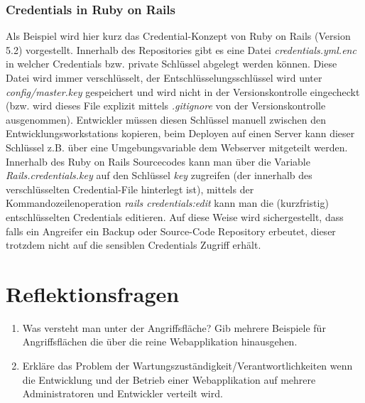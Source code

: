 \subsubsection{Credentials in Ruby on Rails}

Als Beispiel wird hier kurz das Credential-Konzept von Ruby on Rails (Version 5.2) vorgestellt. Innerhalb des Repositories gibt es eine Datei \textit{credentials.yml.enc} in welcher Credentials bzw. private Schlüssel abgelegt werden können. Diese Datei wird immer verschlüsselt, der Entschlüsselungsschlüssel wird unter \textit{config/master.key} gespeichert und wird nicht in der Versionskontrolle eingecheckt (bzw. wird dieses File explizit mittels \textit{.gitignore} von der Versionskontrolle ausgenommen). Entwickler müssen diesen Schlüssel manuell zwischen den Entwicklungsworkstations kopieren, beim Deployen auf einen Server kann dieser Schlüssel z.B. über eine Umgebungsvariable dem Webserver mitgeteilt werden. Innerhalb des Ruby on Rails Sourcecodes kann man über die Variable \textit{Rails.credentials.key} auf den Schlüssel \textit{key} zugreifen (der innerhalb des verschlüsselten Credential-File hinterlegt ist), mittels der Kommandozeilenoperation \textit{rails credentials:edit} kann man die (kurzfristig) entschlüsselten Credentials editieren. Auf diese Weise wird sichergestellt, dass falls ein Angreifer ein Backup oder Source-Code Repository erbeutet, dieser trotzdem nicht auf die sensiblen Credentials Zugriff erhält.

\section{Reflektionsfragen}

\begin{enumerate}
	\item Was versteht man unter der Angriffsfläche? Gib mehrere Beispiele für Angriffsflächen die über die reine Webapplikation hinausgehen.
	\item Erkläre das Problem der Wartungszuständigkeit/Verantwortlichkeiten wenn die Entwicklung und der Betrieb einer Webapplikation auf mehrere Administratoren und Entwickler verteilt wird.
\end{enumerate}

